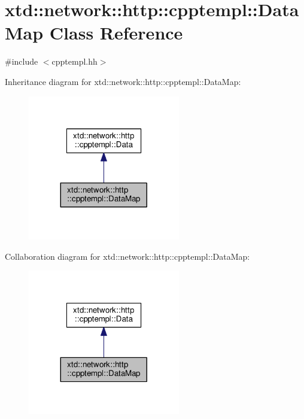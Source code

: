\hypertarget{classxtd_1_1network_1_1http_1_1cpptempl_1_1DataMap}{\section{xtd\-:\-:network\-:\-:http\-:\-:cpptempl\-:\-:Data\-Map Class Reference}
\label{classxtd_1_1network_1_1http_1_1cpptempl_1_1DataMap}
}


{\ttfamily \#include $<$cpptempl.\-hh$>$}



Inheritance diagram for xtd\-:\-:network\-:\-:http\-:\-:cpptempl\-:\-:Data\-Map\-:
\nopagebreak
\begin{figure}[H]
\begin{center}
\leavevmode
\includegraphics[width=188pt]{classxtd_1_1network_1_1http_1_1cpptempl_1_1DataMap__inherit__graph}
\end{center}
\end{figure}


Collaboration diagram for xtd\-:\-:network\-:\-:http\-:\-:cpptempl\-:\-:Data\-Map\-:
\nopagebreak
\begin{figure}[H]
\begin{center}
\leavevmode
\includegraphics[width=188pt]{classxtd_1_1network_1_1http_1_1cpptempl_1_1DataMap__coll__graph}
\end{center}
\end{figure}

